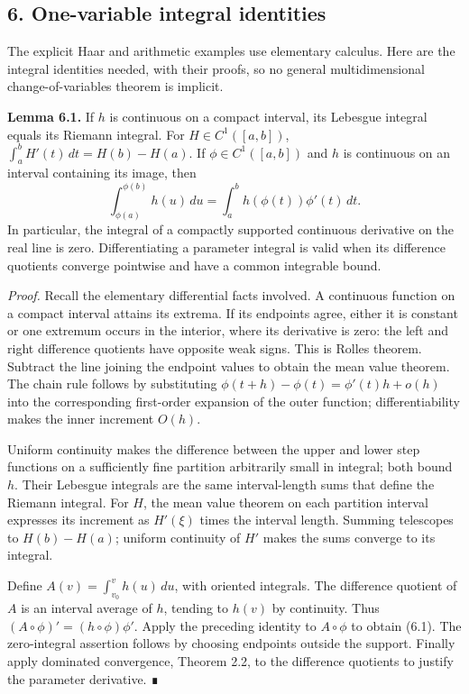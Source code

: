 \documentclass[
  english,
  11pt,
  a4paper,
]{article}
\begin{document}
\subsection{6. One-variable integral
identities}\label{measure-and-hilbert-space-tools--6-one-variable-integral-identities}

The explicit Haar and arithmetic examples use elementary calculus. Here
are the integral identities needed, with their proofs, so no general
multidimensional change-of-variables theorem is implicit.

\textbf{Lemma 6.1.} If \(h\) is continuous on a compact interval, its
Lebesgue integral equals its Riemann integral. For \(H\in C^1([a,b])\),
\(\int_a^b H'(t)\,dt=H(b)-H(a)\). If \(\phi\in C^1([a,b])\) and \(h\) is
continuous on an interval containing its image, then
\[\int_{\phi(a)}^{\phi(b)}h(u)\,du
=\int_a^b h(\phi(t))\phi'(t)\,dt.
\tag{6.1}\] In particular, the integral of a compactly supported
continuous derivative on the real line is zero. Differentiating a
parameter integral is valid when its difference quotients converge
pointwise and have a common integrable bound.

\emph{Proof.} Recall the elementary differential facts involved. A
continuous function on a compact interval attains its extrema. If its
endpoints agree, either it is constant or one extremum occurs in the
interior, where its derivative is zero: the left and right difference
quotients have opposite weak signs. This is Rolle\textquotesingle s
theorem. Subtract the line joining the endpoint values to obtain the
mean value theorem. The chain rule follows by substituting
\(\phi(t+h)-\phi(t)=\phi'(t)h+o(h)\) into the corresponding first-order
expansion of the outer function; differentiability makes the inner
increment \(O(h)\).

Uniform continuity makes the difference between the upper and lower step
functions on a sufficiently fine partition arbitrarily small in
integral; both bound \(h\). Their Lebesgue integrals are the same
interval-length sums that define the Riemann integral. For \(H\), the
mean value theorem on each partition interval expresses its increment as
\(H'(\xi)\) times the interval length. Summing telescopes to
\(H(b)-H(a)\); uniform continuity of \(H'\) makes the sums converge to
its integral.

Define \(A(v)=\int_{v_0}^v h(u)\,du\), with oriented integrals. The
difference quotient of \(A\) is an interval average of \(h\), tending to
\(h(v)\) by continuity. Thus \((A\circ\phi)'=(h\circ\phi)\phi'\). Apply
the preceding identity to \(A\circ\phi\) to obtain (6.1). The
zero-integral assertion follows by choosing endpoints outside the
support. Finally apply dominated convergence, Theorem 2.2, to the
difference quotients to justify the parameter derivative. ∎
\end{document}
